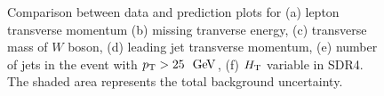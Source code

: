 \begin{figure}[htb]
\begin{center}
	\caption{Comparison between data and prediction plots for (a) lepton transverse momentum 
        (b) missing tranverse energy, (c) transverse mass of $W$ boson, (d)
        leading jet transverse momentum, (e) number of jets in the event with $\pt>25~\gev$,
        (f) $\HT$ variable in SDR4.
        The shaded area represents the total background uncertainty.\label{fig:sdr4}}
\end{center}\end{figure}

